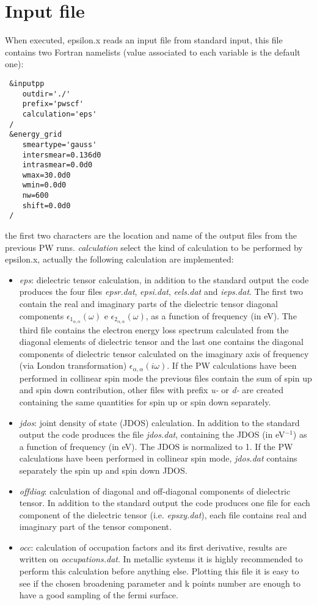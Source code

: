 \documentclass[twocolumn]{article}
\begin{document}
\section{Input file}
When executed, epsilon.x reads an input file from standard input, this file contains two Fortran namelists
(value associated to each variable is the default one):
\begin{verbatim}
 &inputpp
    outdir='./'
    prefix='pwscf'
    calculation='eps'
 /
 &energy_grid
    smeartype='gauss'
    intersmear=0.136d0
    intrasmear=0.0d0
    wmax=30.0d0
    wmin=0.0d0
    nw=600
    shift=0.0d0
 /
\end{verbatim}
the first two characters are the location and name of the output files from the previous PW runs. \emph{calculation}
select the kind of calculation to be performed by epsilon.x, actually the following calculation are implemented:
\begin{itemize}
\item  \emph{eps}: dielectric tensor calculation, in addition to the standard output the code produces the four files
\emph{epsr.dat}, \emph{epsi.dat}, \emph{eels.dat} and \emph{ieps.dat}. The first two contain the real and imaginary
parts of the dielectric
tensor diagonal components $\epsilon_{1_{\alpha,\alpha}}(\omega)$ e $\epsilon_{2_{\alpha,\alpha}}(\omega)$,
as a function of frequency (in eV). The third file contains the electron energy loss spectrum calculated from the diagonal
elements of dielectric tensor and the last one contains the diagonal components of
dielectric tensor calculated on the imaginary axis of frequency (via London transformation)
$\epsilon_{\alpha,\alpha}(i\omega)$. If the PW calculations have been performed in collinear spin mode the previous files 
contain the sum of spin up and spin down contribution, other files with prefix \emph{u-} or  \emph{d-} are created containing 
the same quantities for spin up or spin down separately. 
\item  \emph{jdos}: joint density of state (JDOS) calculation. 
In addition to the standard output the code produces the file
\emph{jdos.dat}, containing the JDOS (in eV$^{-1}$) as a function 
of frequency (in eV). The JDOS is normalized to 1. If the PW 
calculations have been performed in collinear spin mode, 
\emph{jdos.dat} contains separately the spin up and spin down JDOS.
\item  \emph{offdiag}: calculation of diagonal and off-diagonal components of dielectric tensor. In addition
to the standard output the code produces one file for each component of the dielectric tensor (i.e.
\emph{epsxy.dat}), each file contains real and imaginary part of the tensor component.
\item  \emph{occ}: calculation of occupation factors and its first derivative, results are written on 
\emph{occupations.dat}. In metallic systems it is highly recommended to perform this calculation before
anything else.  
Plotting this file it is easy to see if the chosen broadening parameter and k points number 
are enough to have a good sampling of the fermi surface.
\end{itemize}
\end{document}
